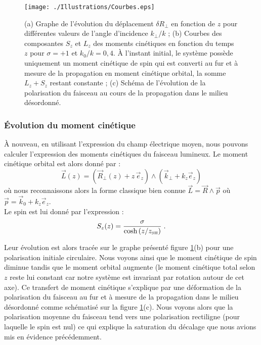 \documentclass[a4paper,11pt]{article} %
\begin{document}
	
	\begin{figure}[h]
		\centering
		\begin{minipage}[c]{0.85\linewidth}
			\centering
			\texttt{[image: ./Illustrations/Courbes.eps]}
			\caption{(a) Graphe de l'évolution du déplacement $ \delta R_\perp $ en fonction de $ z $ pour différentes valeurs de l'angle d'incidence $k_\perp/k $ ; (b) Courbes des composantes $ S_z $ et $ L_z $ des moments cinétiques en fonction du temps $ z $ pour $ \sigma = + 1 $ et $ k_0 / k = 0,4 $. \`{A} l'instant initial, le système possède uniquement un moment cinétique de spin qui est converti au fur et à mesure de la propagation en moment cinétique orbital, la somme $ L_z + S_z $ restant constante ; (c) Schéma de l'évolution de la polarisation du faisceau au cours de la propagation dans le milieu désordonné.}
			\label{fig:Plot}
		\end{minipage}
	\end{figure}
	
	\subsubsection{\'Evolution du moment cinétique}
	\`A nouveau, en utilisant l'expression du champ électrique moyen, nous pouvons calculer l'expression des moments cinétiques du faisceau lumineux. Le moment cinétique orbital est alors donné par :
	\begin{equation*}
		\label{exp_L(z)}
		\vec{L}(z) = \left(\vec{R}_\perp(z) + z \, \vec{e}_z \right) \wedge ( \vec{k}_\perp + k_z \vec{e}_z ) 
	\end{equation*}
	où nous reconnaissons alors la forme classique bien connue $ \vec{L} = \vec{R} \wedge \vec{p} $ où $ \vec{p} = \vec{k}_0 + k_z \vec{e}_z $.\\
	
	Le spin est lui donné par l'expression :
	\begin{equation}
		\label{exp_S(z)}
		S_z(z) =  \frac{ \sigma}{ \cosh \left( z/z_\text{{\tiny SH}} \right) } \; .
	\end{equation}
	
	Leur évolution est alors tracée sur le graphe présenté figure \ref{fig:Plot}(b) pour une polarisation initiale circulaire. Nous voyons ainsi que le moment cinétique de spin diminue tandis que le moment orbital augmente (le moment cinétique total selon $ z $ reste lui constant car notre système est invariant par rotation autour de cet axe). Ce transfert de moment cinétique s'explique par une déformation de la polarisation du faisceau au fur et à mesure de la propagation dans le milieu désordonné comme schématisé sur la figure \ref{fig:Plot}(c). Nous voyons alors que la polarisation moyenne du faisceau tend vers une polarisation rectiligne (pour laquelle le spin est nul) ce qui explique la saturation du décalage que nous avions mis en évidence précédemment.
	
\end{document}
